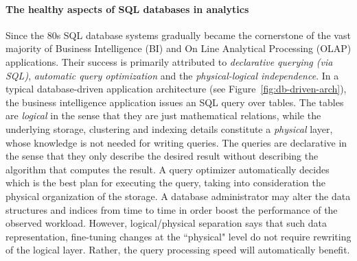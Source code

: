 

\paragraph{The healthy aspects of SQL databases in analytics}
Since the 80s SQL database systems gradually became the cornerstone of the vast majority of Business Intelligence (BI) and On Line Analytical Processing (OLAP) applications. Their success is primarily attributed to {\em declarative querying (via SQL)}, {\em automatic query optimization} and the {\em physical-logical independence}. In a typical database-driven application architecture (see Figure~\ref{fig:db-driven-arch}), the business intelligence application issues an SQL query over tables. The tables are {\em logical} in the sense that they are just mathematical relations, while the underlying storage, clustering and indexing details constitute a {\em physical} layer, whose knowledge is not needed for writing queries. The queries are declarative in the sense that they only describe the desired result without describing the algorithm that computes the result. A query optimizer automatically decides which is the best plan for executing the query, taking into consideration the physical organization of the storage. A database administrator may alter the data structures and indices from time to time in order boost the performance of the observed workload. However, logical/physical separation says that such data representation, fine-tuning changes at the ``physical" level do not require rewriting of the logical layer. Rather, the query processing speed will automatically benefit.



